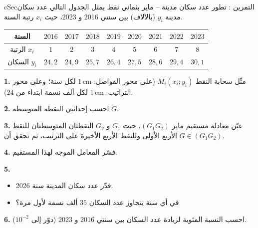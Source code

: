\documentclass[12pt,a4paper]{article}
\newenvironment{BOX}[2]{\begin{otherlanguage}{english}\begin{arbox}{#1}{#2}}{\end{arbox}\end{otherlanguage}}
\newcounter{exo}
\newenvironment{tamrin}[1]{\stepcounter{exo}\begin{BOX}{cSec}{التمرين \theexo: #1}}{\end{BOX}}
\newenvironment{LTR}{\begin{otherlanguage}{english}}{\end{otherlanguage}}
\newcommand{\ar}[1]{\foreignlanguage{arabic}{#1}}
\newenvironment{sq}{\begin{itemize}[leftmargin=2.4em,itemsep=3pt]}{\end{itemize}}
\newcommand{\qa}{\item[(أ)]}\newcommand{\qb}{\item[(ب)]}\newcommand{\qc}{\item[(جـ)]}\newcommand{\qd}{\item[(د)]}\newcommand{\qe}{\item[(هـ)]}
\newcommand{\QQ}[1]{\par\smallskip\textbf{#1.} }
\begin{document}
\begin{tamrin}{تطور عدد سكان مدينة -- ماير بثماني نقط}
يمثل الجدول التالي عدد سكان مدينة $y_i$ (بالآلاف) بين سنتي 2016 و 2023، حيث $x_i$ رتبة السنة.
\begin{center}\begin{LTR}\renewcommand{\arraystretch}{1.35}\small
\begin{tabular}{|c|c|c|c|c|c|c|c|c|}\hline
\rowcolor{cSec!12}\ar{السنة} & $2016$ & $2017$ & $2018$ & $2019$ & $2020$ & $2021$ & $2022$ & $2023$\\\hline
\ar{الرتبة} $x_i$ & $1$ & $2$ & $3$ & $4$ & $5$ & $6$ & $7$ & $8$\\\hline
\ar{السكان} $y_i$ & $24,2$ & $24,9$ & $25,7$ & $26,4$ & $27,5$ & $28,6$ & $29,4$ & $30,1$\\\hline
\end{tabular}\end{LTR}\end{center}
\QQ{1} مثّل سحابة النقط $M_i(x_i;y_i)$ (على محور الفواصل: $1\,\text{cm}$ لكل سنة؛ وعلى محور التراتيب: $1\,\text{cm}$ لكل ألف نسمة ابتداء من $24$).
\QQ{2} احسب إحداثيي النقطة المتوسطة $G$.
\QQ{3} عيّن معادلة مستقيم ماير $(G_1G_2)$، حيث $G_1$ و $G_2$ النقطتان المتوسطتان للنقط الأربع الأولى وللنقط الأربع الأخيرة على الترتيب، ثم تحقق أن $G\in(G_1G_2)$.
\QQ{4} فسّر المعامل الموجه لهذا المستقيم.
\QQ{5}
\begin{sq}
\qa قدّر عدد سكان المدينة سنة 2026.
\qb في أي سنة يتجاوز عدد السكان $35$ ألف نسمة لأول مرة؟
\end{sq}
\QQ{6} احسب النسبة المئوية لزيادة عدد السكان بين سنتي 2016 و 2023 (دوّر إلى $10^{-2}$).
\end{tamrin}
\end{document}
